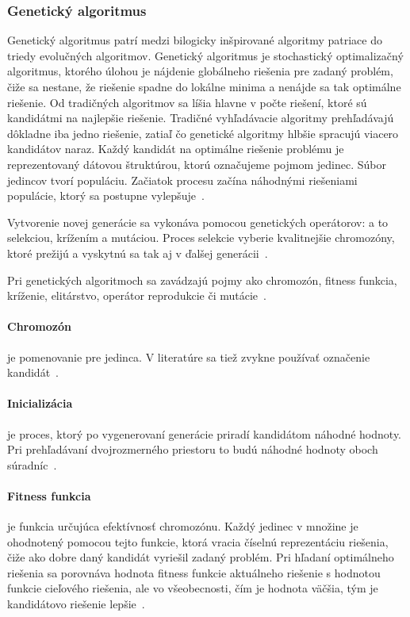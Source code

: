 \documentclass[a4paper,slovak,12pt,appendix]{article}
\begin{document}
\subsubsection{Genetický algoritmus}
Genetický algoritmus patrí medzi bilogicky inšpirované algoritmy patriace do
triedy evolučných algoritmov. Genetický algoritmus je stochastický
optimalizačný algoritmus, ktorého úlohou je nájdenie globálneho riešenia pre
zadaný problém, čiže sa nestane, že riešenie spadne do lokálne minima a nenájde
sa tak optimálne riešenie. Od tradičných algoritmov sa líšia hlavne v počte
riešení, ktoré sú kandidátmi na najlepšie riešenie. Tradičné vyhľadávacie
algoritmy prehľadávajú dôkladne iba jedno riešenie, zatiaľ čo genetické
algoritmy hlbšie spracujú viacero kandidátov naraz. Každý kandidát na optimálne
riešenie problému je reprezentovaný dátovou štruktúrou, ktorú označujeme pojmom
jedinec. Súbor jedincov tvorí populáciu. Začiatok procesu začína náhodnými
riešeniami populácie, ktorý sa postupne vylepšuje~\cite{Chavan2015}.

Vytvorenie novej generácie sa vykonáva pomocou genetických operátorov:
a to selekciou, krížením a mutáciou. Proces selekcie vyberie kvalitnejšie
chromozóny, ktoré prežijú a vyskytnú sa tak aj v ďalšej
generácii~\cite{Simonova2007}.

Pri genetických algoritmoch sa zavádzajú pojmy ako chromozón, fitness funkcia,
kríženie, elitárstvo, operátor reprodukcie či mutácie~\cite{Chavan2015}.

\paragraph{Chromozón} je pomenovanie pre jedinca. V literatúre sa tiež zvykne
používať označenie kandidát~\cite{Arun2016}.

\paragraph{Inicializácia} je proces, ktorý po vygenerovaní generácie priradí
kandidátom náhodné hodnoty. Pri prehľadávaní dvojrozmerného priestoru to budú
náhodné hodnoty oboch súradníc~\cite{Lazinica2009}.

\paragraph{Fitness funkcia} je funkcia určujúca efektívnosť chromozónu. Každý
jedinec v množine je ohodnotený pomocou tejto funkcie, ktorá vracia číselnú
reprezentáciu riešenia, čiže ako dobre daný kandidát vyriešil zadaný problém.
Pri hľadaní optimálneho riešenia sa porovnáva hodnota fitness funkcie aktuálneho
riešenie s hodnotou funkcie cieľového riešenia, ale vo všeobecnosti, čím je
hodnota väčšia, tým je kandidátovo riešenie
lepšie~\cite{Chavan2015, Lazinica2009, Simonova2007}.
\end{document}
